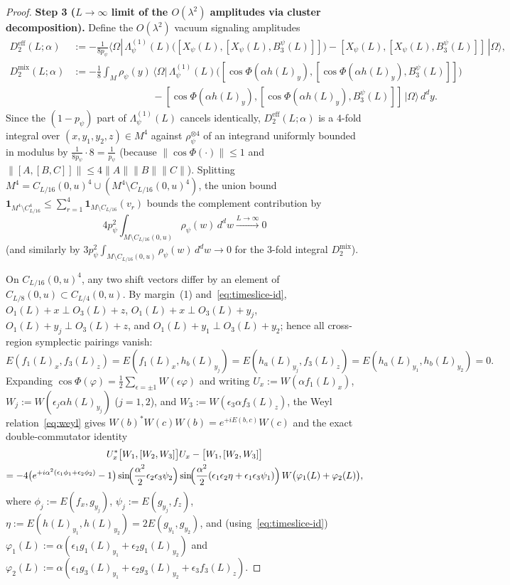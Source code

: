 \documentclass[11pt,a4paper]{article}
\theoremstyle{definition}
\theoremstyle{remark}
\newcommand{\one}{\mathbf{1}}
\newcommand{\ket}[1]{|#1\rangle}
\newcommand{\bra}[1]{\langle #1|}
\newcommand{\norm}[1]{\|#1\|}
\begin{document}
\begin{proof}
\medskip\noindent\textbf{Step 3 ($L\to\infty$ limit of the $O(\lambda^2)$ amplitudes via cluster decomposition).}
Define the $O(\lambda^2)$ vacuum signaling amplitudes
\begin{align*}
D_2^{\mathrm{eff}}(L;\alpha) &:= -\frac{1}{8p_\psi}\bra{\Omega}\,\Lambda_\psi^{(1)}(L)\bigl([X_\psi(L),[X_\psi(L),B_3^\psi(L)]]\bigr) - [X_\psi(L),[X_\psi(L),B_3^\psi(L)]]\,\ket{\Omega}, \\
D_2^{\mathrm{mix}}(L;\alpha) &:= -\frac{1}{8}\int_M \rho_\psi(y)\,\bra{\Omega}\,\Lambda_\psi^{(1)}(L)\bigl([\cos\Phi(\alpha h(L)_y),[\cos\Phi(\alpha h(L)_y),B_3^\psi(L)]]\bigr) \\
&\qquad\qquad\qquad\qquad - [\cos\Phi(\alpha h(L)_y),[\cos\Phi(\alpha h(L)_y),B_3^\psi(L)]]\,\ket{\Omega}\,d^dy.
\end{align*}
Since the $(1-p_\psi)$ part of $\Lambda_\psi^{(1)}(L)$ cancels identically, $D_2^{\mathrm{eff}}(L;\alpha)$ is a $4$-fold integral over $(x,y_1,y_2,z)\in M^4$ against $\rho_\psi^{\otimes 4}$ of an integrand uniformly bounded in modulus by $\frac{1}{8p_\psi}\cdot 8 = \frac{1}{p_\psi}$ (because $\norm{\cos\Phi(\cdot)}\le 1$ and $\norm{[A,[B,C]]}\le 4\norm{A}\norm{B}\norm{C}$). Splitting $M^4 = C_{L/16}(0,u)^4 \cup (M^4\setminus C_{L/16}(0,u)^4)$, the union bound $\one_{M^4\setminus C_{L/16}^4} \le \sum_{r=1}^4 \one_{M\setminus C_{L/16}}(v_r)$ bounds the complement contribution by
\[
4p_\psi^2\int_{M\setminus C_{L/16}(0,u)}\rho_\psi(w)\,d^dw \xrightarrow{L\to\infty} 0
\]
(and similarly by $3p_\psi^2\int_{M\setminus C_{L/16}(0,u)}\rho_\psi(w)\,d^dw \to 0$ for the $3$-fold integral $D_2^{\mathrm{mix}}$).

On $C_{L/16}(0,u)^4$, any two shift vectors differ by an element of $C_{L/8}(0,u)\subset C_{L/4}(0,u)$. By margin~(1) and~\eqref{eq:timeslice-id}, $O_1(L)+x \perp O_3(L)+z$, $O_1(L)+x \perp O_3(L)+y_j$, $O_1(L)+y_j \perp O_3(L)+z$, and $O_1(L)+y_1 \perp O_3(L)+y_2$; hence all cross-region symplectic pairings vanish:
\[
E(f_1(L)_x, f_3(L)_z) = E(f_1(L)_x, h_b(L)_{y_j}) = E(h_a(L)_{y_j}, f_3(L)_z) = E(h_a(L)_{y_1}, h_b(L)_{y_2}) = 0.
\]
Expanding $\cos\Phi(\varphi) = \frac{1}{2}\sum_{\epsilon=\pm 1} W(\epsilon\varphi)$ and writing $U_x := W(\alpha f_1(L)_x)$, $W_j := W(\epsilon_j\alpha h(L)_{y_j})$ ($j=1,2$), and $W_3 := W(\epsilon_3\alpha f_3(L)_z)$, the Weyl relation~\eqref{eq:weyl} gives $W(b)^* W(c) W(b) = e^{+i E(b,c)} W(c)$ and the exact double-commutator identity
\begin{multline}\label{eq:weyl-dc}
U_x^*\bigl[W_1, [W_2, W_3]\bigr] U_x - \bigl[W_1, [W_2, W_3]\bigr] \\
= -4\bigl(e^{+i\alpha^2(\epsilon_1\phi_1 + \epsilon_2\phi_2)} - 1\bigr)\sin\!\Bigl(\frac{\alpha^2}{2}\epsilon_2\epsilon_3\psi_2\Bigr)\sin\!\Bigl(\frac{\alpha^2}{2}(\epsilon_1\epsilon_2\eta + \epsilon_1\epsilon_3\psi_1)\Bigr)\,W\bigl(\varphi_1(L) + \varphi_2(L)\bigr),
\end{multline}
where $\phi_j := E(f_x, g_{y_j})$, $\psi_j := E(g_{y_j}, f_z)$, $\eta := E(h(L)_{y_1}, h(L)_{y_2}) = 2E(g_{y_1}, g_{y_2})$, and (using~\eqref{eq:timeslice-id}) $\varphi_1(L) := \alpha(\epsilon_1 g_1(L)_{y_1} + \epsilon_2 g_1(L)_{y_2})$ and $\varphi_2(L) := \alpha(\epsilon_1 g_3(L)_{y_1} + \epsilon_2 g_3(L)_{y_2} + \epsilon_3 f_3(L)_z)$.


\end{proof}
\end{document}

